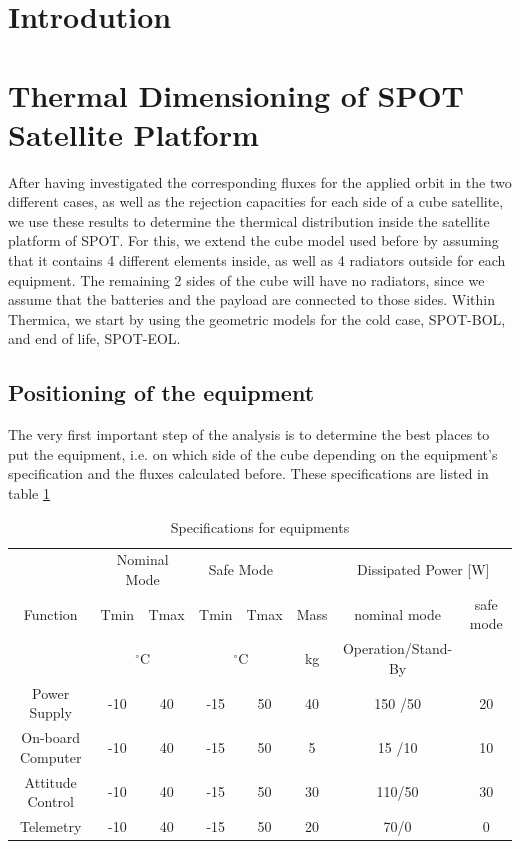 \section{Introdution}


\section{Thermal Dimensioning of SPOT Satellite Platform}

After having investigated the corresponding fluxes for the applied orbit in the two different cases, as well as the rejection capacities for each side of a cube satellite, we use these results to determine the thermical distribution inside the satellite platform of SPOT. For this, we extend the cube model used before by assuming that it contains 4 different elements inside, as well as 4 radiators outside for each equipment. The remaining 2 sides of the cube will have no radiators, since we assume that the batteries and the payload are connected to those sides. Within Thermica, we start by using the geometric models for the cold case, SPOT-BOL, and end of life, SPOT-EOL. 

\subsection{Positioning of the equipment}
The very first important step of the analysis is to determine the best places to put the equipment, i.e. on which side of the cube depending on the equipment's specification and the fluxes calculated before. These specifications are listed in table \ref{tab:equipmentspecification}

\begin{table}[h!]
\centering
\begin{tabular}{ | c| c|c|c|c|c|c|c| }
\hline 
&  \multicolumn{2}{|c|}{Nominal Mode} &  \multicolumn{2}{|c|}{Safe Mode} & & \multicolumn{2}{|c|}{Dissipated Power [W] }\\
Function & Tmin & Tmax & Tmin & Tmax & Mass & nominal mode & safe mode  \\
& \multicolumn{2}{|c|}{$^{\circ}$C} & \multicolumn{2}{|c|}{$^{\circ}$C} & kg &Operation/Stand-By &  \\  \hline

Power Supply &-10   & 40  & -15&50  & 40  &  150 /50 & 20  \\ \hline
On-board Computer &-10  & 40 &-15 &50 &5 &15 /10& 10 \\ \hline
Attitude Control &-10  &40 & -15& 50&30 &110/50 &30  \\ \hline
Telemetry &-10  &40 &-15 &50 &20 &70/0 & 0  \\ \hline
\end{tabular}
\caption{Specifications for equipments}
\label{tab:equipmentspecification}
\end{table}

